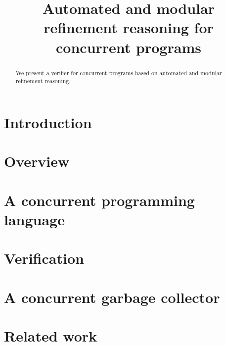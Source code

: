\documentclass [preprint]{sigplanconf}
\theoremstyle{remark}
\theoremstyle{definition}
\newcommand{\civl}{{\sc civl}\xspace}
\newcommand{\boogie}{{\sc boogie}\xspace}
\newcommand{\zthree}{{\sc Z3}\xspace}
\newcommand{\casm}{{\sc casm}\xspace}
\begin{document}
\setlength{\pdfpageheight}{\paperheight}
\setlength{\pdfpagewidth}{\paperwidth}


\title{Automated and modular refinement reasoning for concurrent programs}
\authorinfo{}{}{}

\maketitle



\begin{abstract}
We present a verifier for concurrent programs based on automated and modular refinement reasoning.  

\end{abstract}

\section{Introduction}
\label{sec:introduction}

\section{Overview}
\label{sec:overview}

\section{A concurrent programming language}
\label{sec:language}

\section{Verification}
\label{sec:verification}

\section{A concurrent garbage collector}
\label{sec:gc}


\section{Related work}
\label{sec:related}





\newpage

%
\end{document}
